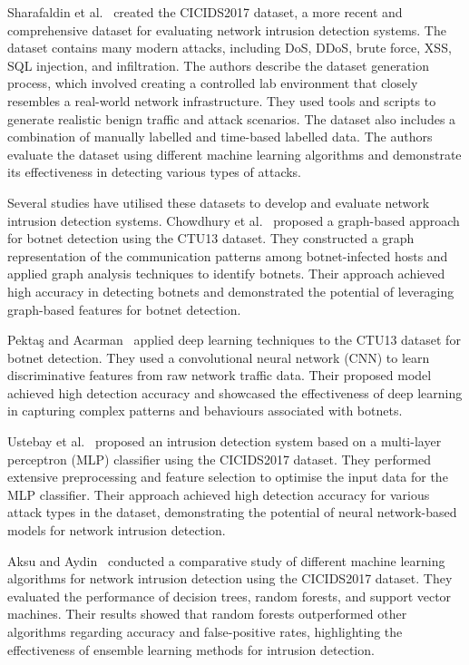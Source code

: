Sharafaldin et al.~\cite{sharafaldin2018toward} created the CICIDS2017 dataset, a more recent and comprehensive dataset for evaluating network intrusion detection systems. The dataset contains many modern attacks, including DoS, DDoS, brute force, XSS, SQL injection, and infiltration. The authors describe the dataset generation process, which involved creating a controlled lab environment that closely resembles a real-world network infrastructure. They used tools and scripts to generate realistic benign traffic and attack scenarios. The dataset also includes a combination of manually labelled and time-based labelled data. The authors evaluate the dataset using different machine learning algorithms and demonstrate its effectiveness in detecting various types of attacks.

Several studies have utilised these datasets to develop and evaluate network intrusion detection systems. Chowdhury et al.~\cite{chowdhury2017botnet} proposed a graph-based approach for botnet detection using the CTU13 dataset. They constructed a graph representation of the communication patterns among botnet-infected hosts and applied graph analysis techniques to identify botnets. Their approach achieved high accuracy in detecting botnets and demonstrated the potential of leveraging graph-based features for botnet detection.

Pektaş and Acarman~\cite{pektacs2019deep} applied deep learning techniques to the CTU13 dataset for botnet detection. They used a convolutional neural network (CNN) to learn discriminative features from raw network traffic data. Their proposed model achieved high detection accuracy and showcased the effectiveness of deep learning in capturing complex patterns and behaviours associated with botnets.

Ustebay et al.~\cite{ustebay2018intrusion} proposed an intrusion detection system based on a multi-layer perceptron (MLP) classifier using the CICIDS2017 dataset. They performed extensive preprocessing and feature selection to optimise the input data for the MLP classifier. Their approach achieved high detection accuracy for various attack types in the dataset, demonstrating the potential of neural network-based models for network intrusion detection.

Aksu and Aydin~\cite{aksu2018detecting} conducted a comparative study of different machine learning algorithms for network intrusion detection using the CICIDS2017 dataset. They evaluated the performance of decision trees, random forests, and support vector machines. Their results showed that random forests outperformed other algorithms regarding accuracy and false-positive rates, highlighting the effectiveness of ensemble learning methods for intrusion detection.

